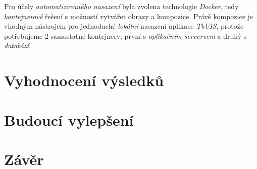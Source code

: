 \documentclass[czech, ma, kiv, he, iso690alph, pdf, viewonly]{fasthesis}
\begin{document}
    Pro účely \textit{automatizovaného nasazení} byla zvolena technologie \textit{Docker}, tedy \textit{kontejnerové} řešení s možností vytvářet obrazy a kompozice. Právě kompozice je vhodným nástrojem pro jednoduché \textit{lokální} nasazení aplikace \textit{TbUIS}, protože potřebujeme 2 samostatné kontejnery; první s \textit{aplikačním servervem} a druhý s \textit{databází}.


\chapter{Vyhodnocení výsledků}

\chapter{Budoucí vylepšení}

\chapter{Závěr}

%
%
%
%
\backmatter
\printbibliography
\listoffigures
\listoftables
\listoflistings
%
%
\setbackpageqrcode
\backpage
\end{document}
